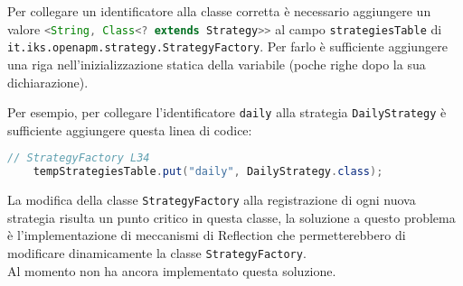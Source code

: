 		Per collegare un identificatore alla classe corretta è necessario aggiungere un valore 
		\lstinline[language=Java]{<String, Class<? extends Strategy>>} al campo \lstinline{strategiesTable} 
		di 	\lstinline{it.iks.openapm.strategy.StrategyFactory}. 
		Per farlo è sufficiente aggiungere una riga nell'inizializzazione statica della variabile 
		(poche righe dopo la sua dichiarazione).

		Per esempio, per collegare l'identificatore \lstinline{daily} alla strategia \lstinline{DailyStrategy} è
		sufficiente aggiungere questa linea di codice:
		\begin{lstlisting}[language=Java]
	// StrategyFactory L34
	tempStrategiesTable.put("daily", DailyStrategy.class);
		\end{lstlisting}
		
		
		La modifica della classe \verb=StrategyFactory= alla registrazione di ogni nuova strategia risulta un punto critico in 
		questa classe, la soluzione a questo problema è l'implementazione di meccanismi di Reflection che permetterebbero
		di modificare dinamicamente la classe \verb=StrategyFactory=.\\
		Al momento \GroupName{} non ha ancora implementato questa soluzione.
